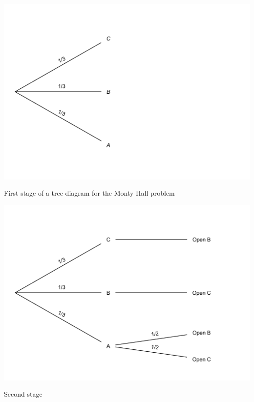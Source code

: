 \documentclass[justified]{tufte-book}
\theoremstyle{definition}
\theoremstyle{definition}
\theoremstyle{definition}
\theoremstyle{remark}
\begin{document}
\begin{marginfigure}
\includegraphics{_main_files/figure-latex/montytree1-1} \caption[First stage of a tree diagram for the Monty Hall problem]{First stage of a tree diagram for the Monty Hall problem}\label{fig:montytree1}
\end{marginfigure}
\begin{marginfigure}
\includegraphics{_main_files/figure-latex/montytree2-1} \caption[Second stage]{Second stage}\label{fig:montytree2}
\end{marginfigure}
\end{document}

